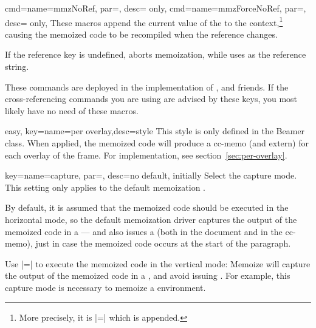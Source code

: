 \documentclass[a4paper,11pt]{article}
\begin{document}
\begin{doc}{
    cmd={name=mmzNoRef, par=, desc= only},
    cmd={name=mmzForceNoRef, par=, desc= only},
  }
  These macros append the current value of the  to the
  context,\footnote{More precisely, it is |=| which is appended.}  causing the memoized code to be recompiled
  when the reference changes.

  If the reference key is undefined,  aborts memoization,
  while  uses  as the reference string.

  These commands are deployed in the implementation of ,  and friends.  If the
  cross-referencing commands you are using are advised by these keys, you most
  likely have no need of these macros.
\end{doc}

\begin{doc}{easy, key={name=per overlay,desc=style}}
  This style is only defined in the Beamer class.  When applied, the memoized
  code will produce a cc-memo (and extern) for each overlay of the frame.  For
  implementation, see section~\ref{sec:per-overlay}.
\end{doc}

\begin{doc}{
    key={name=capture, par=,
      desc={no default, initially }}
  }
  Select the capture mode.  This setting only applies to the default
  memoization .

  By default, it is assumed that the memoized code should be executed in the
  horizontal mode, so the default memoization driver captures the output of the
  memoized code in a  --- and also issues a 
  (both in the document and in the cc-memo), just in case the memoized code
  occurs at the start of the paragraph.

  Use |=| to execute the memoized code in
  the vertical mode: Memoize will capture the output of the memoized code in a
  , and avoid issuing .  For example, this
  capture mode is necessary to memoize a  environment.
\end{doc}
\end{document}
